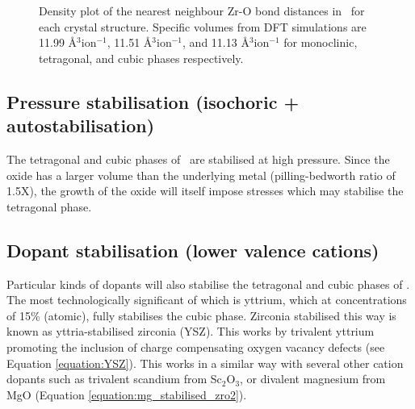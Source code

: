\begin{figure}
\begin{center}
		\caption{Density plot of the nearest neighbour Zr-O bond distances in \zirconia\ for each crystal structure. Specific volumes from DFT simulations are 11.99 \r{A}$^{3}$ion$^{-1}$, 11.51 \r{A}$^{3}$ion$^{-1}$, and 11.13 \r{A}$^{3}$ion$^{-1}$ for monoclinic, tetragonal, and cubic phases respectively.}
		\label{figure:zrobonddistance}
	\end{center}
\end{figure}


\subsection{Pressure stabilisation (isochoric + autostabilisation)}

The tetragonal and cubic phases of \zirconia\ are stabilised at high pressure. Since the oxide has a larger volume than the underlying metal (pilling-bedworth ratio of 1.5X), the growth of the oxide will itself impose stresses which may stabilise the tetragonal phase.

\subsection{Dopant stabilisation (lower valence cations)}

Particular kinds of dopants will also stabilise the tetragonal and cubic phases of \zirconia. The most technologically significant of which is yttrium, which at concentrations of 15\% (atomic), fully stabilises the cubic phase. Zirconia stabilised this way is known as yttria-stabilised zirconia (YSZ). This works by trivalent yttrium promoting the inclusion of charge compensating oxygen vacancy defects (see Equation \ref{equation:YSZ}). This works in a similar way with several other cation dopants such as trivalent scandium from Sc$_{2}$O$_{3}$, or divalent magnesium from MgO (Equation \ref{equation:mg_stabilised_zro2}).

